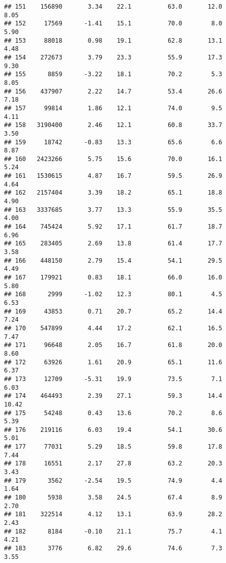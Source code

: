 \documentclass[
]{article}
\begin{document}
\begin{verbatim}
## 151    156890       3.34    22.1          63.0       12.0              8.05
## 152     17569      -1.41    15.1          70.0        8.0              5.90
## 153     88018       0.98    19.1          62.8       13.1              4.48
## 154    272673       3.79    23.3          55.9       17.3              9.30
## 155      8859      -3.22    18.1          70.2        5.3              8.05
## 156    437907       2.22    14.7          53.4       26.6              7.18
## 157     99814       1.86    12.1          74.0        9.5              4.11
## 158   3190400       2.46    12.1          60.8       33.7              3.50
## 159     18742      -0.83    13.3          65.6        6.6              8.87
## 160   2423266       5.75    15.6          70.0       16.1              5.24
## 161   1530615       4.87    16.7          59.5       26.9              4.64
## 162   2157404       3.39    18.2          65.1       18.8              4.90
## 163   3337685       3.77    13.3          55.9       35.5              4.00
## 164    745424       5.92    17.1          61.7       18.7              6.96
## 165    283405       2.69    13.8          61.4       17.7              3.58
## 166    448150       2.79    15.4          54.1       29.5              4.49
## 167    179921       0.83    18.1          66.0       16.0              5.80
## 168      2999      -1.02    12.3          80.1        4.5              6.53
## 169     43853       0.71    20.7          65.2       14.4              7.24
## 170    547899       4.44    17.2          62.1       16.5              7.47
## 171     96648       2.05    16.7          61.8       20.0              8.60
## 172     63926       1.61    20.9          65.1       11.6              6.37
## 173     12709      -5.31    19.9          73.5        7.1              6.03
## 174    464493       2.39    27.1          59.3       14.4             10.42
## 175     54248       0.43    13.6          70.2        8.6              5.39
## 176    219116       6.03    19.4          54.1       30.6              5.01
## 177     77031       5.29    18.5          59.8       17.8              7.44
## 178     16551       2.17    27.8          63.2       20.3              3.43
## 179      3562      -2.54    19.5          74.9        4.4              1.64
## 180      5938       3.58    24.5          67.4        8.9              2.70
## 181    322514       4.12    13.1          63.9       28.2              2.43
## 182      8184      -0.10    21.1          75.7        4.1              4.21
## 183      3776       6.82    29.6          74.6        7.3              3.55

\end{verbatim}
\end{document}
